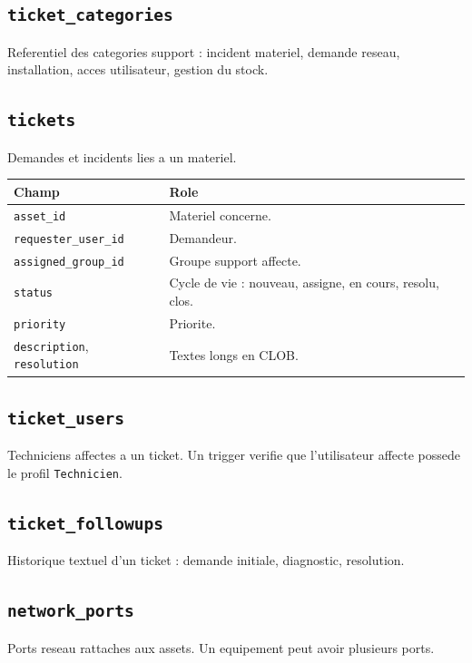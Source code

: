 \documentclass[11pt,a4paper]{article}
\begin{document}
\subsection{\texttt{ticket\_categories}}

Referentiel des categories support : incident materiel, demande reseau, installation, acces utilisateur, gestion du stock.

\subsection{\texttt{tickets}}

Demandes et incidents lies a un materiel.

\begin{longtable}{|p{4cm}|p{10cm}|}
\hline
\textbf{Champ} & \textbf{Role} \\
\hline
\texttt{asset\_id} & Materiel concerne. \\
\hline
\texttt{requester\_user\_id} & Demandeur. \\
\hline
\texttt{assigned\_group\_id} & Groupe support affecte. \\
\hline
\texttt{status} & Cycle de vie : nouveau, assigne, en cours, resolu, clos. \\
\hline
\texttt{priority} & Priorite. \\
\hline
\texttt{description}, \texttt{resolution} & Textes longs en CLOB. \\
\hline
\end{longtable}

\subsection{\texttt{ticket\_users}}

Techniciens affectes a un ticket. Un trigger verifie que l'utilisateur affecte possede le profil \texttt{Technicien}.

\subsection{\texttt{ticket\_followups}}

Historique textuel d'un ticket : demande initiale, diagnostic, resolution.

\subsection{\texttt{network\_ports}}

Ports reseau rattaches aux assets. Un equipement peut avoir plusieurs ports.
\end{document}
